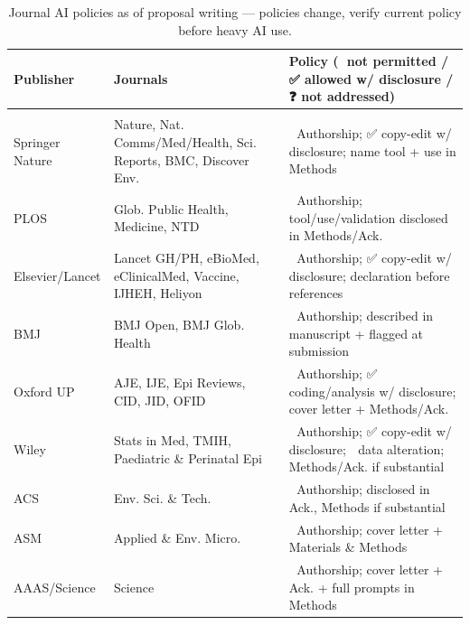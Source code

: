 \documentclass[
]{book}
\begin{document}
\begin{table}
\centering
\caption{\label{tab:ai-journal-policies}Journal AI policies as of proposal writing — policies change, verify current policy before heavy AI use.}
\centering
\fontsize{12}{14}\selectfont
\begin{tabular}[t]{>{\raggedright\arraybackslash}p{4em}|>{\raggedright\arraybackslash}p{8em}|>{\raggedright\arraybackslash}p{15em}}
\hline
Publisher & Journals & Policy (🚫 not permitted / ✅ allowed w/ disclosure / ❓ not addressed)\\
\hline
\multicolumn{3}{l}{\textbf{Policy documented}}\\
\hline
\hspace{1em}Springer Nature & Nature, Nat. Comms/Med/Health, Sci. Reports, BMC, Discover Env. & 🚫 Authorship; ✅ copy-edit w/ disclosure; name tool + use in Methods\\
\hline
\hspace{1em}PLOS & Glob. Public Health, Medicine, NTD & 🚫 Authorship; tool/use/validation disclosed in Methods/Ack.\\
\hline
\hspace{1em}Elsevier/Lancet & Lancet GH/PH, eBioMed, eClinicalMed, Vaccine, IJHEH, Heliyon & 🚫 Authorship; ✅ copy-edit w/ disclosure; declaration before references\\
\hline
\hspace{1em}BMJ & BMJ Open, BMJ Glob. Health & 🚫 Authorship; described in manuscript + flagged at submission\\
\hline
\hspace{1em}Oxford UP & AJE, IJE, Epi Reviews, CID, JID, OFID & 🚫 Authorship; ✅ coding/analysis w/ disclosure; cover letter + Methods/Ack.\\
\hline
\hspace{1em}Wiley & Stats in Med, TMIH, Paediatric \& Perinatal Epi & 🚫 Authorship; ✅ copy-edit w/ disclosure; 🚫 data alteration; Methods/Ack. if substantial\\
\hline
\hspace{1em}ACS & Env. Sci. \& Tech. & 🚫 Authorship; disclosed in Ack., Methods if substantial\\
\hline
\hspace{1em}ASM & Applied \& Env. Micro. & 🚫 Authorship; cover letter + Materials \& Methods\\
\hline
\hspace{1em}AAAS/Science & Science & 🚫 Authorship; cover letter + Ack. + full prompts in Methods\\
\hline

\end{tabular}
\end{table}
\end{document}
